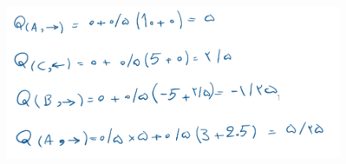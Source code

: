 \documentclass{university}
\begin{document}
\section{}
\begin{figure}[H]
    \centering
    \includegraphics[width=\textwidth]{assets/6.png}
\end{figure}
\end{document}

